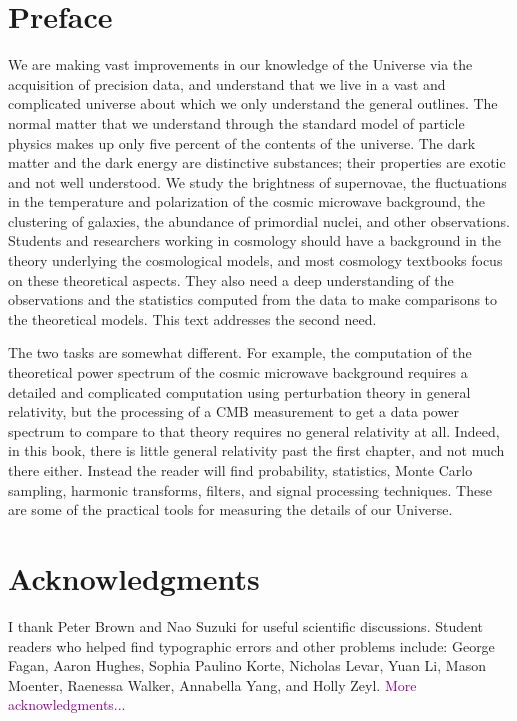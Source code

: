  {}\section*{Preface}

We are making vast improvements in our knowledge of the Universe via the acquisition of precision data, and understand that we live in a vast and complicated universe about which we only understand the general outlines.  The normal matter that we understand through the standard model of particle physics makes up only five percent of the contents of the universe.  The dark matter and the dark energy are distinctive substances; their  properties are exotic and not well understood.  We study the brightness of supernovae, the fluctuations in the temperature and polarization of the cosmic microwave background, the clustering of galaxies, the abundance of primordial nuclei, and other observations.   Students and researchers working in cosmology should have a background in the theory underlying the cosmological models, and most cosmology textbooks focus on these theoretical aspects.  They also need a deep understanding of the observations and the statistics computed from the data to make comparisons to the theoretical models.  This text addresses the second need.

The two tasks are somewhat different.  For example, the computation of the theoretical power spectrum of the cosmic microwave background requires a detailed and complicated computation using perturbation theory in general relativity, but the processing of a CMB measurement to get a data power spectrum to compare to that theory requires no general relativity at all.  Indeed, in this book, there is little general relativity past the first chapter, and not much there either.  Instead the reader will find probability, statistics, Monte Carlo sampling, harmonic transforms, filters, and signal processing techniques.  These are some of the practical tools for measuring the details of our Universe.

 {}\section*{Acknowledgments}
I thank
Peter Brown
and
Nao Suzuki
for useful scientific discussions.
Student readers who helped find typographic errors and other problems include:
George Fagan,
Aaron Hughes,
Sophia Paulino Korte,
Nicholas Levar,
Yuan Li,
Mason Moenter,
Raenessa Walker,
Annabella Yang,
and Holly Zeyl.
\textcolor{purple}{More acknowledgments...}
